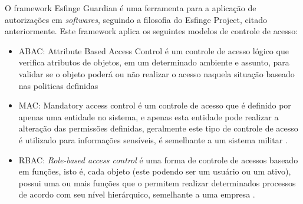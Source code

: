 \par O framework Esfinge Guardian é uma ferramenta para a aplicação de autorizações em \textit{softwares}, seguindo a filosofia do Esfinge Project, citado anteriormente. Este framework aplica os seguintes modelos de controle de acesso:
\begin{itemize}
    \item ABAC: Attribute Based Access Control é um controle de acesso lógico que verifica atributos de objetos, em um determinado ambiente e assunto, para validar se o objeto poderá ou não realizar o acesso naquela situação baseado nas politicas definidas \cite{hu2015attribute}
    \item MAC: Mandatory access control é um controle de acesso que é definido por apenas uma entidade no sistema, e apenas esta entidade pode realizar a alteração das permissões definidas, geralmente este tipo de controle de acesso é utilizado para informações sensíveis, é semelhante a um sistema militar \cite{lindqvist2006mandatory}.
    \item RBAC: \textit{Role-based access control} é uma forma de controle de acessos baseado em funções, isto é, cada objeto (este podendo ser um usuário ou um ativo), possui uma ou mais funções que o permitem realizar determinados processos de acordo com seu nível hierárquico, semelhante a uma empresa \cite{sandhu2000nist}.
\end{itemize}